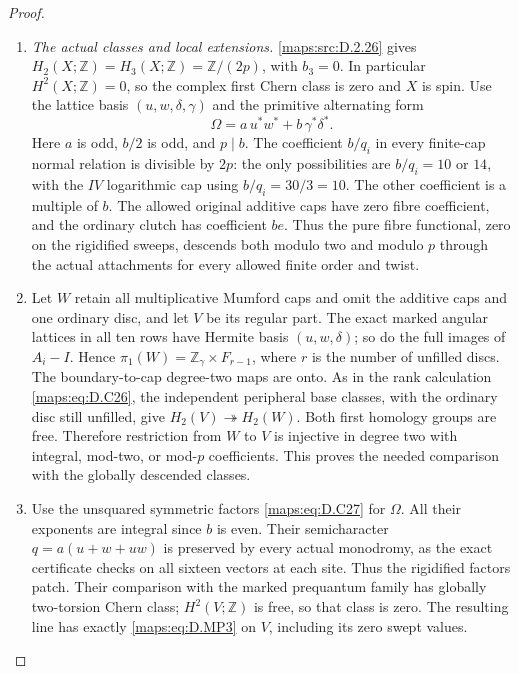 \begin{proof}
\begin{enumerate}[label=\arabic*.,leftmargin=*]
\item \emph{The actual classes and local extensions.}
\ref{maps:src:D.2.26} gives $H_2(X;\mathbb Z)=H_3(X;\mathbb Z)=\mathbb Z/(2p)$,
with $b_3=0$. In particular $H^2(X;\mathbb Z)=0$, so the complex
first Chern class is zero and $X$ is spin. Use the lattice basis
$(u,w,\delta,\gamma)$ and the primitive alternating form
\[
             \Omega=a\,u^*w^*+b\,\gamma^*\delta^*.
                                                        \tag{D.MP3}\label{maps:eq:D.MP3}
\]
Here $a$ is odd, $b/2$ is odd, and $p\mid b$. The coefficient
$b/q_i$ in every finite-cap normal relation is divisible by $2p$:
the only possibilities are $b/q_i=10$ or $14$, with the $IV$
logarithmic cap using $b/q_i=30/3=10$. The other coefficient is
a multiple of $b$. The allowed original additive caps have zero
fibre coefficient, and the ordinary clutch has coefficient $be$.
Thus the pure fibre functional, zero on the rigidified sweeps,
descends both modulo two and modulo $p$ through the actual
attachments for every allowed finite order and twist.

\item Let $W$ retain all multiplicative Mumford caps and omit the additive
caps and one ordinary disc, and let $V$ be its regular part. The
exact marked angular lattices in all ten rows have Hermite basis
$(u,w,\delta)$; so do the full images of $A_i-I$. Hence
$\pi_1(W)=\mathbb Z_\gamma\times F_{r-1}$, where $r$ is the number
of unfilled discs. The boundary-to-cap degree-two maps are onto.
As in the rank calculation \eqref{maps:eq:D.C26}, the independent peripheral
base classes, with the ordinary disc still unfilled, give
$H_2(V)\twoheadrightarrow H_2(W)$. Both first homology groups are
free. Therefore restriction from $W$ to $V$ is injective in degree
two with integral, mod-two, or mod-$p$ coefficients. This proves
the needed comparison with the globally descended classes.

\item Use the unsquared symmetric factors \eqref{maps:eq:D.C27} for $\Omega$.
All their exponents are integral since $b$ is even. Their
semicharacter $q=a(u+w+uw)$ is preserved by every actual
monodromy, as the exact certificate checks on all sixteen
vectors at each site. Thus the rigidified factors patch.
Their comparison with the marked prequantum family has globally
two-torsion Chern class; $H^2(V;\mathbb Z)$ is free, so that class
is zero. The resulting line has exactly \eqref{maps:eq:D.MP3} on $V$,
including its zero swept values.


\end{enumerate}
\end{proof}
